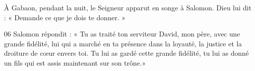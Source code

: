 À Gabaon, pendant la nuit, le Seigneur apparut en songe à Salomon. Dieu lui dit : « Demande ce que je dois te donner. »

06 Salomon répondit : « Tu as traité ton serviteur David, mon père, avec une grande fidélité, lui qui a marché en ta présence dans la loyauté, la justice et la droiture de cœur envers toi. Tu lui as gardé cette grande fidélité, tu lui as donné un fils qui est assis maintenant sur son trône.»
